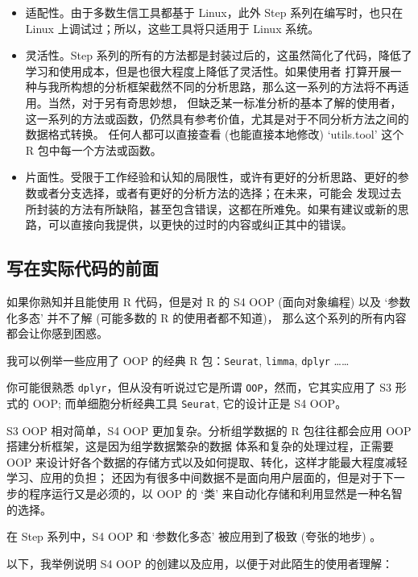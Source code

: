 \documentclass[
]{article}
\providecommand{\tightlist}{%
  \setlength{\itemsep}{0pt}\setlength{\parskip}{0pt}}
\begin{document}
\begin{itemize}
\tightlist
\item
  适配性。由于多数生信工具都基于 Linux，此外 Step 系列在编写时，也只在 Linux 上调试过；所以，这些工具将只适用于 Linux 系统。
\item
  灵活性。Step 系列的所有的方法都是封装过后的，这虽然简化了代码，降低了学习和使用成本，但是也很大程度上降低了灵活性。如果使用者
  打算开展一种与我所构想的分析框架截然不同的分析思路，那么这一系列的方法将不再适用。当然，对于另有奇思妙想，
  但缺乏某一标准分析的基本了解的使用者，这一系列的方法或函数，仍然具有参考价值，尤其是对于不同分析方法之间的数据格式转换。
  任何人都可以直接查看 (也能直接本地修改)
  `utils.tool' 这个 R 包中每一个方法或函数。
\item
  片面性。受限于工作经验和认知的局限性，或许有更好的分析思路、更好的参数或者分支选择，或者有更好的分析方法的选择；在未来，可能会
  发现过去所封装的方法有所缺陷，甚至包含错误，这都在所难免。如果有建议或新的思路，可以直接向我提供，以更快的过时的内容或纠正其中的错误。
\end{itemize}

\hypertarget{demo}{%
\subsection{写在实际代码的前面}\label{demo}}

如果你熟知并且能使用 R 代码，但是对 R 的 S4 OOP (面向对象编程) 以及 `参数化多态' 并不了解 (可能多数的 R 的使用者都不知道)，
那么这个系列的所有内容都会让你感到困惑。

我可以例举一些应用了 OOP 的经典 R 包：\texttt{Seurat}, \texttt{limma}, \texttt{dplyr} \ldots\ldots{}

你可能很熟悉 \texttt{dplyr}，但从没有听说过它是所谓 \texttt{OOP}，然而，它其实应用了 S3 形式的 OOP; 而单细胞分析经典工具 \texttt{Seurat}, 它的设计正是 S4 OOP。

S3 OOP 相对简单，S4 OOP 更加复杂。分析组学数据的 R 包往往都会应用 OOP 搭建分析框架，这是因为组学数据繁杂的数据
体系和复杂的处理过程，正需要 OOP 来设计好各个数据的存储方式以及如何提取、转化，这样才能最大程度减轻学习、应用的负担；
还因为有很多中间数据不是面向用户层面的，但是对于下一步的程序运行又是必须的，以 OOP 的 `类' 来自动化存储和利用显然是一种名智的选择。

在 Step 系列中，S4 OOP 和 `参数化多态' 被应用到了极致 (夸张的地步) 。

以下，我举例说明 S4 OOP 的创建以及应用，以便于对此陌生的使用者理解：
\end{document}

